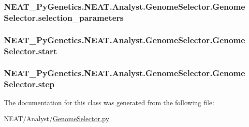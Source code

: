 \subsubsection[{\texorpdfstring{selection\+\_\+parameters}{selection_parameters}}]{\setlength{\rightskip}{0pt plus 5cm}N\+E\+A\+T\+\_\+\+Py\+Genetics.\+N\+E\+A\+T.\+Analyst.\+Genome\+Selector.\+Genome\+Selector.\+selection\+\_\+parameters\hspace{0.3cm}{\ttfamily [static]}}\hypertarget{classNEAT__PyGenetics_1_1NEAT_1_1Analyst_1_1GenomeSelector_1_1GenomeSelector_af6ab170d7eef08b15d79eabb074ade5e}{}\label{classNEAT__PyGenetics_1_1NEAT_1_1Analyst_1_1GenomeSelector_1_1GenomeSelector_af6ab170d7eef08b15d79eabb074ade5e}
\subsubsection[{\texorpdfstring{start}{start}}]{\setlength{\rightskip}{0pt plus 5cm}N\+E\+A\+T\+\_\+\+Py\+Genetics.\+N\+E\+A\+T.\+Analyst.\+Genome\+Selector.\+Genome\+Selector.\+start\hspace{0.3cm}{\ttfamily [static]}}\hypertarget{classNEAT__PyGenetics_1_1NEAT_1_1Analyst_1_1GenomeSelector_1_1GenomeSelector_a41d6d1538df7134f2f31519ff49f6c58}{}\label{classNEAT__PyGenetics_1_1NEAT_1_1Analyst_1_1GenomeSelector_1_1GenomeSelector_a41d6d1538df7134f2f31519ff49f6c58}
\subsubsection[{\texorpdfstring{step}{step}}]{\setlength{\rightskip}{0pt plus 5cm}N\+E\+A\+T\+\_\+\+Py\+Genetics.\+N\+E\+A\+T.\+Analyst.\+Genome\+Selector.\+Genome\+Selector.\+step\hspace{0.3cm}{\ttfamily [static]}}\hypertarget{classNEAT__PyGenetics_1_1NEAT_1_1Analyst_1_1GenomeSelector_1_1GenomeSelector_af8c8af7836b5ae5b52f6688c1266bb06}{}\label{classNEAT__PyGenetics_1_1NEAT_1_1Analyst_1_1GenomeSelector_1_1GenomeSelector_af8c8af7836b5ae5b52f6688c1266bb06}


The documentation for this class was generated from the following file\+:\begin{DoxyCompactItemize}
\item 
N\+E\+A\+T/\+Analyst/\hyperlink{GenomeSelector_8py}{Genome\+Selector.\+py}\end{DoxyCompactItemize}
